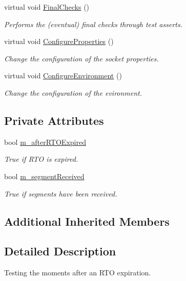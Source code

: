 \begin{DoxyCompactItemize}
virtual void \hyperlink{classTcpRtoTest_af762d4eb10f65f55518a307dc352ae41}{Final\+Checks} ()
\begin{DoxyCompactList}\small\item\em Performs the (eventual) final checks through test asserts. \end{DoxyCompactList}\item 
virtual void \hyperlink{classTcpRtoTest_ae777449b8b22f9ac512728584647e997}{Configure\+Properties} ()
\begin{DoxyCompactList}\small\item\em Change the configuration of the socket properties. \end{DoxyCompactList}\item 
virtual void \hyperlink{classTcpRtoTest_a0dfc73de2b55e3b66bf3e911be8b4150}{Configure\+Environment} ()
\begin{DoxyCompactList}\small\item\em Change the configuration of the evironment. \end{DoxyCompactList}\end{DoxyCompactItemize}
\subsection*{Private Attributes}
\begin{DoxyCompactItemize}
\item 
bool \hyperlink{classTcpRtoTest_a776fcdaa63e6e9d277ed0544ccd9e56d}{m\+\_\+after\+R\+T\+O\+Expired}
\begin{DoxyCompactList}\small\item\em True if R\+TO is expired. \end{DoxyCompactList}\item 
bool \hyperlink{classTcpRtoTest_a39388469b1d3059f808e554e309cf40d}{m\+\_\+segment\+Received}
\begin{DoxyCompactList}\small\item\em True if segments have been received. \end{DoxyCompactList}\end{DoxyCompactItemize}
\subsection*{Additional Inherited Members}


\subsection{Detailed Description}
Testing the moments after an R\+TO expiration. 


